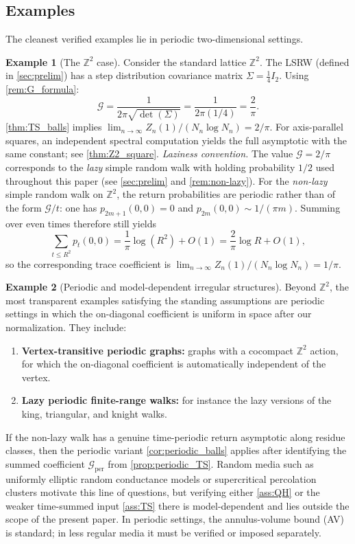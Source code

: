 \documentclass[reqno]{amsart}
\numberwithin{equation}{section}
\theoremstyle{definition}
\newtheorem{example}[example]{Example}
\theoremstyle{remark}
\newcommand{\Cref}[1]{\autoref{#1}}
\newcommand{\cG}{\mathcal{G}}
\begin{document}
\subsection{Examples}
The cleanest verified examples lie in periodic two-dimensional settings.

\begin{example}[The $\mathbb{Z}^2$ case]\label{rem:pi2}
Consider the standard lattice $\mathbb{Z}^2$. The LSRW (defined in \Cref{sec:prelim}) has a step distribution covariance matrix $\Sigma = \frac{1}{4} I_2$. Using \Cref{rem:G_formula}:
\[
\cG = \frac{1}{2\pi \sqrt{\det(\Sigma)}} = \frac{1}{2\pi (1/4)} = \frac{2}{\pi}.
\]
\Cref{thm:TS_balls} implies $\lim_{n \to \infty} Z_n(1) / (N_n \log N_n) = 2/\pi$.
For axis-parallel squares, an independent spectral computation yields the full asymptotic with the same constant; see \Cref{thm:Z2_square}.
%
\smallskip
\noindent\emph{Laziness convention.}
The value $\cG=2/\pi$ corresponds to the \emph{lazy} simple random walk with holding probability $1/2$ used throughout this paper (see \Cref{sec:prelim} and \Cref{rem:non-lazy}). For the \emph{non-lazy} simple random walk on $\mathbb{Z}^2$, the return probabilities are periodic rather than of the form $\cG/t$: one has $p_{2m+1}(0,0)=0$ and $p_{2m}(0,0)\sim 1/(\pi m)$. Summing over even times therefore still yields
\[
\sum_{t\le R^2} p_t(0,0)=\frac{1}{\pi}\log(R^2)+O(1)=\frac{2}{\pi}\log R+O(1),
\]
so the corresponding trace coefficient is $\lim_{n\to\infty} Z_n(1)/(N_n\log N_n)=1/\pi$.
\end{example}


\begin{example}[Periodic and model-dependent irregular structures]\label{ex:irregular}
Beyond $\mathbb{Z}^2$, the most transparent examples satisfying the standing assumptions are periodic settings in which the on-diagonal coefficient is uniform in space after our normalization. They include:
\begin{enumerate}
    \item \textbf{Vertex-transitive periodic graphs:} graphs with a cocompact $\mathbb{Z}^2$ action, for which the on-diagonal coefficient is automatically independent of the vertex.
    \item \textbf{Lazy periodic finite-range walks:} for instance the lazy versions of the king, triangular, and knight walks.
\end{enumerate}
If the non-lazy walk has a genuine time-periodic return asymptotic along residue classes, then the periodic variant \Cref{cor:periodic_balls} applies after identifying the summed coefficient $\cG_{\mathrm{per}}$ from \Cref{prop:periodic_TS}.
Random media such as uniformly elliptic random conductance models or supercritical percolation clusters motivate this line of questions, but verifying either \Cref{ass:QH} or the weaker time-summed input \Cref{ass:TS} there is model-dependent and lies outside the scope of the present paper. In periodic settings, the annulus-volume bound (AV) is standard; in less regular media it must be verified or imposed separately.
\end{example}
\end{document}
